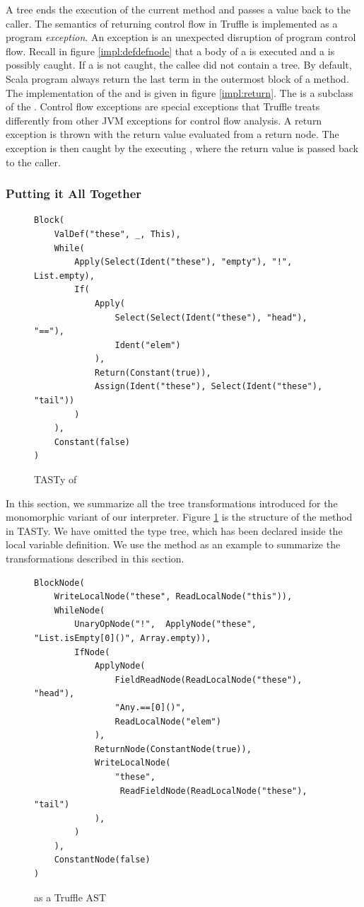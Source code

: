 A  tree ends the execution of the current method and passes a value back to the caller.
The semantics of returning control flow in Truffle is implemented as a program \textit{exception}.
An exception is an unexpected disruption of program control flow.
Recall in figure \ref{impl:defdefnode} that a body of a  is executed and a  is possibly caught.
If a  is not caught, the callee did not contain a  tree.
By default, Scala program always return the last term in the outermost block of a method. 
The implementation of the  and  is given in figure \ref{impl:return}.
The  is a subclass of the . 
Control flow exceptions are special exceptions that Truffle treats differently from other JVM exceptions for control flow analysis.
A return exception is thrown with the return value evaluated from a return node.
The exception is then caught by the executing , where the return value is passed back to the caller. 

\subsubsection*{Putting it All Together}

\begin{figure}[!htb]
\begin{verbatim}
Block(
	ValDef("these", _, This),			
	While(
		Apply(Select(Ident("these"), "empty"), "!", List.empty),
		If(
			Apply(
				Select(Select(Ident("these"), "head"), "=="), 
				Ident("elem")
			),
			Return(Constant(true)),
			Assign(Ident("these"), Select(Ident("these"), "tail"))
		)	
	),
	Constant(false)
)
\end{verbatim}
\caption{TASTy of }
\label{tasty:list-contains}
\end{figure}

In this section, we summarize all the tree transformations introduced for the monomorphic variant of our interpreter.
Figure \ref{tasty:list-contains} is the structure of the  method in TASTy.
We have omitted the type tree, which has been declared inside the local variable definition.
We use the  method as an example to summarize the transformations described in this section.

\begin{figure}[!htb]
\begin{verbatim}
BlockNode(
	WriteLocalNode("these", ReadLocalNode("this")),
	WhileNode(
		UnaryOpNode("!",  ApplyNode("these", "List.isEmpty[0]()", Array.empty)),
		IfNode(
			ApplyNode(
				FieldReadNode(ReadLocalNode("these"), "head"), 
				"Any.==[0]()", 
				ReadLocalNode("elem")
			),
			ReturnNode(ConstantNode(true)),
			WriteLocalNode(
				"these",
				 ReadFieldNode(ReadLocalNode("these"), "tail")
			),	
		)   
	),
	ConstantNode(false)
)
\end{verbatim}
\caption{ as a Truffle AST}
\label{example:truffle-list-contains}
\end{figure}

